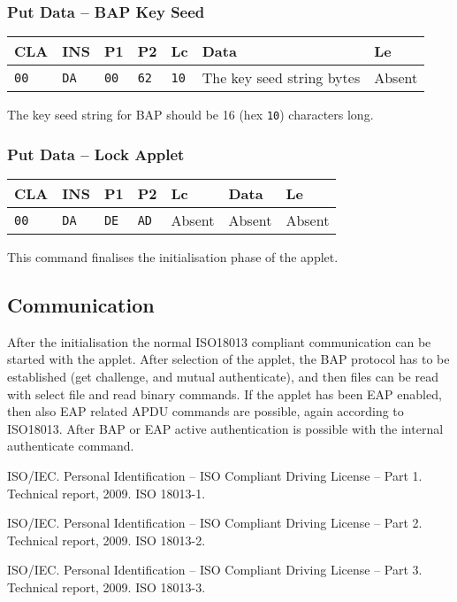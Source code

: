 \documentclass{article}
\begin{document}
\subsubsection{Put Data -- BAP Key Seed}

\begin{flushleft}
\begin{tabular}{|l|l|l|l|l|l|l|}
\hline
CLA & INS & P1 & P2 & Lc & Data & Le \\
\hline
\texttt{00} & \texttt{DA} & \texttt{00} & \texttt{62} &
\texttt{10} & The key seed string bytes & Absent \\
\hline
\end{tabular}
\end{flushleft}
The key seed string for BAP should be 16 (hex \texttt{10}) characters
long.

\subsubsection{Put Data -- Lock Applet}

\begin{flushleft}
\begin{tabular}{|l|l|l|l|l|l|l|}
\hline
CLA & INS & P1 & P2 & Lc & Data & Le \\
\hline
\texttt{00} & \texttt{DA} & \texttt{DE} & \texttt{AD} &
Absent & Absent & Absent \\
\hline
\end{tabular}
\end{flushleft}
This command finalises the initialisation phase of the applet.

\subsection{Communication}

After the initialisation the normal ISO18013 compliant communication
can be started with the applet. After selection of the applet, the BAP
protocol has to be established (get challenge, and mutual
authenticate), and then files can be read with select file and read
binary commands. If the applet has been EAP enabled, then also EAP
related APDU commands are possible, again according to ISO18013. After
BAP or EAP active authentication is possible with the internal
authenticate command.

\begin{thebibliography}{1}
 ISO/IEC.  \newblock Personal Identification -- ISO
  Compliant Driving License -- Part 1.  \newblock Technical report,
  2009.  \newblock ISO 18013-1.

 ISO/IEC.  \newblock Personal Identification -- ISO
  Compliant Driving License -- Part 2.  \newblock Technical report,
  2009.  \newblock ISO 18013-2.

 ISO/IEC.  \newblock Personal Identification -- ISO
  Compliant Driving License -- Part 3.  \newblock Technical report,
  2009.  \newblock ISO 18013-3.

\end{thebibliography}
\end{document}

